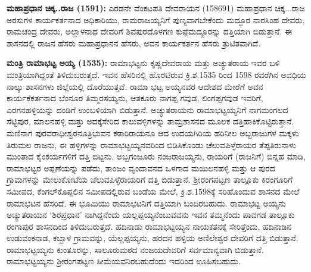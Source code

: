 \textbf{ಮಹಾಪ್ರಧಾನ ಚಿಕ್ಕ..ರಾಜ (1591):} ಎರಡನೇ ವೆಂಕಟಪತಿ ದೇವರಾಯನ (1586\enginline{-}91) ಮಹಾಪ್ರಧಾನ ಚಿಕ್ಕ...ರಾಜ ಅರಸುಗಳ ಕಾರ್ಯಕರ್ತನಾದ ಅಧಿಕಾರಿಯು, ರಾಮರಾಜಯ್ಯನಿಗೆ ಪುಣ್ಯವಾಗಬೇಕೆಂದು ಮದ್ದೂರ ನಾರಸಿಂಹ ದೇವರು, ರಾಮಚಂದ್ರ ದೇವರು, ಅಲ್ಲಾಳನಾಥ ದೇವರಿಗೆ ಶಿವಪುರದೊಳಗಣ ಕುಪ್ಪೆಮದ್ದೂರನ್ನು ದತ್ತಿಯಾಗಿ ಬಿಡುತ್ತಾನೆ. ಈ ಶಾಸನದಲ್ಲಿ ರಾಜನ ಹೆಸರು ಮಹಾಪ್ರಧಾನನ ಹೆಸರು, ಅವನ ಕಾರ್ಯಕರ್ತನ ಹೆಸರು ತ್ರುಟಿತವಾಗಿದೆ.

\textbf{ಮಂತ್ರಿ ರಾಮಾಭಟ್ಟ ಅಯ್ಯ (1535):} ರಾಮಾಭಟ್ಟನು ಕೃಷ್ಣದೇವರಾಯ ಮತ್ತು ಅಚ್ಯುತರಾಯ ಇವರ ಬಳಿ ಮಂತ್ರಿಯಾಗಿದ್ದಂತೆ ತಿಳಿದುಬರುತ್ತದೆ. ಇವನ ಹೆಸರಿನಲ್ಲಿ ಹೊರಟಿರುವ ಕ್ರಿ.ಶ.1535 ರಿಂದ 1598 ರವರೆಗಿನ ಅವಧಿಯ ನಾಲ್ಕು ಶಾಸನಗಳು ಜಿಲ್ಲೆಯಲ್ಲಿ ದೊರೆಯುತ್ತವೆ. ರಾಮಾ ಭಟ್ಟ ಅಯ್ಯನವರ ಆದೇಶದ ಮೇರೆಗೆ ಅವನ ಕಾರ್ಯಕೆಕರ್ತನಾದ ಬೆಂನೂರ ತಿಮ್ಮರಸಯ್ಯನು, ಆತಕೂರು ನಾಗಪ್ಪ ಗವುಡ, ಲಿಂಗಪ್ಪಗವುಡ ಇವರಿಗೆ, ಎರಗನಹಳ್ಳಿಯನ್ನು ದಂಡಿಗೆ ಉಂಬಳಿ\-ಯಾಗಿ ಬಿಡುತ್ತಾನೆ. ಅಚ್ಯುತರಾಯನು ರಾಮಾಭಟ್ಟಯ್ಯನಿಗೆ ನಾಗಮಂಗಲದ ಸೆಟ್ಟಿಪುರ, ಮಾಲನಹಳ್ಳಿ ಮತ್ತು ಅದಕ್ಕೆ\break ಸೇರಿದ ಕಾಲುವಳ್ಳಿಗಳನ್ನು ತಾಮ್ರಶಾಸನದ ಮೂಲಕ ದತ್ತಿಹಾಕಿಕೊಟ್ಟಿರುತ್ತಾನೆ. ಮಣಿನಾಗ ಪುರವರಾಧೀಶ್ವರನೂ\break ತ್ರಿಭುವನ ಕಠಾರಿರಾಯನೂ ಆದ ಉದಯಗಿರಿಯ ಹರಿನೀಲ ಅಬ್ಬರಾಜುಗಳ ಮಕ್ಕಳು ತಿರುಮಲ ರಾಜನು, ಈ ಹಳ್ಳಿಗಳನ್ನು ರಾಮಾಭಟ್ಟಯ್ಯನವರಿಂದ ಬಿಡಿಸಿಕೊಂಡು ಚೆಲುವಪಿಳ್ಳೆರಾಯರ ತೆಪ್ಪತಿರುನಾಳು ಮುಂತಾದ ಕೈಂಕರ್ಯಗಳಿಗೆ ದತ್ತಿ ಬಿಟ್ಟನು. ಅಬ್ಬಗಂಜೂರು ನಂಜರಾಜಯ್ಯನು, ರಾಯರಿಗೆ (ರಾಜನಿಗೆ) ಬಿನ್ನಹ ಮಾಡಿ, ರಾಮಾಭಟ್ಟರ ಅಪ್ಪಣೆಯನ್ನು ಪಡೆದು, ತಾಂಜಂ ವೃಂದಾವನದ ಒಳಗಾದ ಮಯಿಲನಹಳ್ಳಿ ಮತ್ತು ಆ ಪುರದ ಗ್ರಾಮಗಳನ್ನು ಮೇಲುಕೋಟೆಯ ಚೆಲುವಪಿಳ್ಳೆರಾಯರಿಗೆ ದತ್ತಿ ಬಿಡುತ್ತಾನೆ. ಶ‍್ರೀರಂಗಪಟ್ಟಣ ತಾಲ್ಲೂಕು ಕಿರಂಗೂರಿಗೆ ಸಮೀಪದ, ಕೆಂಗಲ್​ಕೊಪ್ಪಲಿನ ಸಮೀಪದಲ್ಲಿರುವ ಬಂಡೆಯ ಮೇಲೆ, ಕ್ರಿ.ಶ.1598ಕ್ಕೆ ಸರಿಹೊಂದುವ ಶಾಸನದ ಮೇಲೆ ರಾಮಾಭಟನ ಹೆಸರಿದೆ. ಈ ಭೂಮಿಯು ರಾಮಾಭಟನಿಗೆ ದತ್ತಿಯಾಗಿ ಬಂದಿರಬಹುದು. ರಾಮಾಭಟ್ಟ ಅಯ್ಯನು ಅಚ್ಯುತರಾಯನ ‘ಶಿರಪ್ರಧಾನ’ ನಾಗಿದ್ದನೆಂದು ಯಲ್ಲಪ್ಪಯ್ಯನೆಂಬುವವನು ಇವನ ತಮ್ಮನೆಂದು ಪಾವಗಡ ತಾಲ್ಲೂಕು ರಂಗಾಪುರ ಶಾಸನದಿಂದ ತಿಳಿದುಬರುತ್ತದೆ. ಹದಿನಾಡು ರಾಮಾಭಟ್ಟಯ್ಯನ ನಾಯಕತನಕ್ಕೆ ಸೇರಿತ್ತೆಂದು, ಹದಿನಾಡಿನ ಉಡುವಂಕನಾಡ, ಕಬ್ಬಾಳ ಗ್ರಾಮವನ್ನು, ಯೆಲ್ಲಪ್ಪಯ್ಯನು, ಹರದನ ಹಳ್ಳಿಯ ಅಣಿಲೇಶ್ವರ ದೇವರಿಗೆ ದತ್ತಿ ಬಿಡುತ್ತಾನೆ. ರಾಮಾಭಟ್ಟಯ್ಯನು ಕುಂತೂರನ್ನು, ಸಾಲೂರುಮಠದ ನಂಜಯದೇವರಿಗೆ ಸರ್ವಮಾನ್ಯವಾಗಿ ಬಿಡುತ್ತಾನೆ. ರಾಮಾಭಟ್ಟಯ್ಯನು ಶ‍್ರೀರಂಗಪಟ್ಟಣ ಸೀಮೆಯವನಿರಬಹುದೆಂದು ಇದರಿಂದ ಊಹಿಸಬಹುದು.

